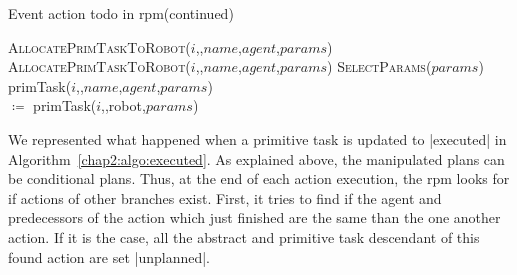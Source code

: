 \documentclass[a4paper,11pt,twoside]{StyleThese}
\begin{document}
\begin{algorithm}[!htb]
	\ContinuedFloat
	\caption{Event action todo in \acrshort{rpm}(continued)}
	\begin{algorithmic}
			\State \textsc{AllocatePrimTaskToRobot($i$,,$name$,$agent$,$params$)}
		\Else
			\\
			\EndWhile
				\State \textsc{AllocatePrimTaskToRobot($i$,,$name$,$agent$,$params$)}
			\EndIf
		\EndIf
	\EndFunction
	\Statex
		\State \textsc{SelectParams($params$)}
		\State primTask($i$,,$name$,$agent$,$params$) 
		\\\hfill $\coloneqq$ primTask($i$,,robot,$params$)
	\EndFor
	\EndFunction
	\end{algorithmic}
\end{algorithm}


We represented what happened when a primitive task is updated to |executed| in Algorithm~\ref{chap2:algo:executed}. As explained above, the manipulated plans can be conditional plans. Thus, at the end of each action execution, the \acrshort{rpm} looks for if actions of other branches exist. First, it tries to find if the agent and predecessors of the action which just finished are the same than the one another action. If it is the case, all the abstract and primitive task descendant of this found action are set |unplanned|. 
\end{document}
